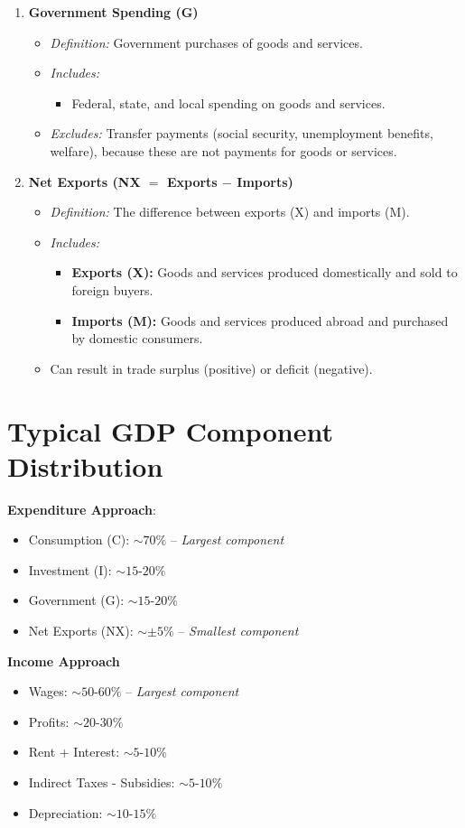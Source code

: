 \documentclass[a4paper, 11pt]{article}
\begin{document}
\begin{enumerate}
\begin{itemize}
    \end{itemize}
    \item \textbf{Government Spending (G)}
    \begin{itemize}
        \item \textit{Definition:} Government purchases of goods and services.
        \item \textit{Includes:}
        \begin{itemize}
            \item Federal, state, and local spending on goods and services.
        \end{itemize}
        \item \textit{Excludes:} Transfer payments (social security, unemployment benefits, welfare), because these are not payments for goods or services.
    \end{itemize}
    \item \textbf{Net Exports (NX $=$ Exports $-$ Imports)}
    \begin{itemize}
        \item \textit{Definition:} The difference between exports (X) and imports (M).
        \item \textit{Includes:}
        \begin{itemize}
            \item \textbf{Exports (X):} Goods and services produced domestically and sold to foreign buyers.
            \item \textbf{Imports (M):} Goods and services produced abroad and purchased by domestic consumers.
        \end{itemize}
        \item Can result in trade surplus (positive) or deficit (negative).
    \end{itemize}
\end{enumerate}

\section{Typical GDP Component Distribution}
\textbf{Expenditure Approach}:
\begin{itemize}
    \item Consumption (C): $\sim 70\%$ -- \textit{Largest component}
    \item Investment (I): $\sim 15\text{-}20\%$
    \item Government (G): $\sim 15\text{-}20\%$
    \item Net Exports (NX): $\sim \pm5\%$ -- \textit{Smallest component}
\end{itemize}
\textbf{Income Approach}
\begin{itemize}
    \item Wages: $\sim 50\text{-}60\%$ -- \textit{Largest component}
    \item Profits: $\sim 20\text{-}30\%$
    \item Rent + Interest: $\sim 5\text{-}10\%$
    \item Indirect Taxes - Subsidies: $\sim 5\text{-}10\%$
    \item Depreciation: $\sim 10\text{-}15\%$
\end{itemize}
\end{document}

